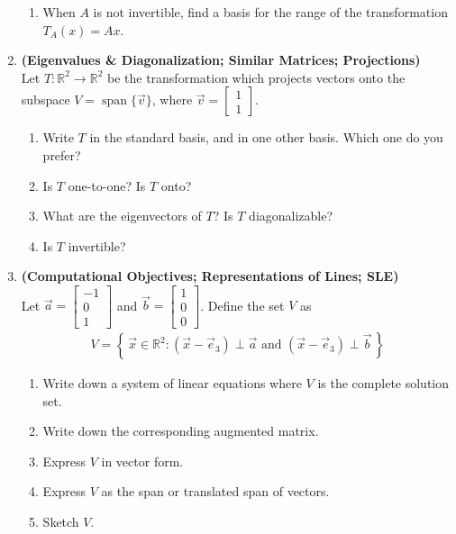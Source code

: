 \documentclass[red]{tutorial}
\newcommand{\R}{\mathbb{R}}
\newcommand{\smat}[1]{\left[\begin{smallmatrix} #1 %
\end{smallmatrix}\right]}
\DeclareMathOperator{\Span} {span}
\theoremstyle{definition}
\theoremstyle{theorem}
\begin{document}
\begin{tutorial}
\begin{enumerate}
\begin{enumerate}
        \item When $A$ is not invertible, find a basis for the range of the
          transformation $T_A(x) = Ax$.
      \end{enumerate}
    \item \textbf{(Eigenvalues \& Diagonalization; Similar Matrices;
      Projections)}\\
      Let $T\colon\R^2\to\R^2$ be the transformation which
      projects vectors onto the subspace $V=\Span\{\vec v\}$,
      where $\vec v = \smat{1\\1}$.
      \begin{enumerate}
        \item \label{q:standard_basis}
          Write $T$ in the standard basis, and in one other basis. Which one do
          you prefer?
        \item Is $T$ one-to-one? Is $T$ onto?
        \item What are the eigenvectors of $T$? Is $T$ diagonalizable?
        \item Is $T$ invertible?
      \end{enumerate}
    \item \textbf{(Computational Objectives; Representations of Lines;
      SLE)}\\
      Let $\vec a = \smat{-1\\0\\1}$ and $\vec b = \smat{1\\0\\0}$.
      Define the set $V$ as
      \begin{align*}
        V = \left\{\,\vec x\in \R^2 :
        (\vec x - \vec e_3)\perp \vec a \text{ and }
        (\vec x - \vec e_3)\perp \vec b \,\right\}
      \end{align*}
      \begin{enumerate}
        \item Write down a system of linear equations where
          $V$ is the complete solution set.
        \item Write down the corresponding augmented matrix.
        \item Express $V$ in vector form.
        \item Express $V$ as the span or translated span of
          vectors.
        \item Sketch $V$.
      \end{enumerate}
  \end{enumerate}
\end{tutorial}
\end{document}

